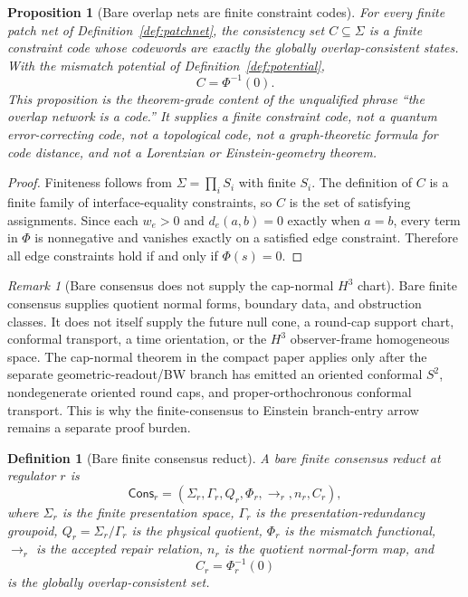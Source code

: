 \documentclass[11pt]{article}
\newtheorem{definition}[theorem]{Definition}
\newtheorem{proposition}[theorem]{Proposition}
\theoremstyle{remark}
\newtheorem{remark}[theorem]{Remark}
\theoremstyle{plain}
\begin{document}
\begin{proposition}[Bare overlap nets are finite constraint codes]\label{prop:constraint-code}
For every finite patch net of Definition~\ref{def:patchnet}, the consistency set \(C\subseteq
\Sigma\) is a finite constraint code whose codewords are exactly the globally overlap-consistent
states. With the mismatch potential of Definition~\ref{def:potential},
\[
C=\Phi^{-1}(0).
\]
This proposition is the theorem-grade content of the unqualified phrase ``the overlap network is
a code.'' It supplies a finite constraint code, not a quantum error-correcting code, not a
topological code, not a graph-theoretic formula for code distance, and not a Lorentzian or
Einstein-geometry theorem.
\end{proposition}

\begin{proof}
Finiteness follows from \(\Sigma=\prod_i S_i\) with finite \(S_i\). The definition of \(C\) is a
finite family of interface-equality constraints, so \(C\) is the set of satisfying assignments.
Since each \(w_e>0\) and \(d_e(a,b)=0\) exactly when \(a=b\), every term in \(\Phi\) is
nonnegative and vanishes exactly on a satisfied edge constraint. Therefore all edge constraints
hold if and only if \(\Phi(s)=0\).
\end{proof}

\begin{remark}[Bare consensus does not supply the cap-normal \(H^3\) chart]
Bare finite consensus supplies quotient normal forms, boundary data, and
obstruction classes. It does not itself supply the future null cone, a
round-cap support chart, conformal transport, a time orientation, or the
\(H^3\) observer-frame homogeneous space. The cap-normal theorem in the
compact paper applies only after the separate geometric-readout/BW branch has
emitted an oriented conformal \(S^2\), nondegenerate oriented round caps, and
proper-orthochronous conformal transport. This is why the finite-consensus to
Einstein branch-entry arrow remains a separate proof burden.
\end{remark}

\begin{definition}[Bare finite consensus reduct]\label{def:bare-finite-consensus-reduct}
A bare finite consensus reduct at regulator \(r\) is
\[
\mathsf{Cons}_r
=
(\Sigma_r,\Gamma_r,Q_r,\Phi_r,\to_r,n_r,C_r),
\]
where \(\Sigma_r\) is the finite presentation space, \(\Gamma_r\) is the
presentation-redundancy groupoid, \(Q_r=\Sigma_r/\Gamma_r\) is the physical
quotient, \(\Phi_r\) is the mismatch functional, \(\to_r\) is the accepted
repair relation, \(n_r\) is the quotient normal-form map, and
\[
C_r=\Phi_r^{-1}(0)
\]
is the globally overlap-consistent set.
\end{definition}
\end{document}
